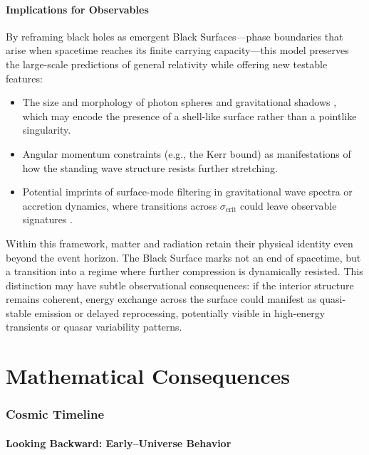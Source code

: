 \documentclass[12pt]{article}
\begin{document}
\subsection{Implications for Observables}

By reframing black holes as emergent Black Surfaces—phase boundaries that arise when spacetime reaches its finite carrying capacity—this model preserves the large-scale predictions of general relativity while offering new testable features:
\begin{itemize}
    \item The size and morphology of photon spheres and gravitational shadows \cite{eventhorizon2019}, which may encode the presence of a shell-like surface rather than a pointlike singularity.
    \item Angular momentum constraints (e.g., the Kerr bound) as manifestations of how the standing wave structure resists further stretching.
    \item Potential imprints of surface-mode filtering in gravitational wave spectra or accretion dynamics, where transitions across $\sigma_{\text{crit}}$ could leave observable signatures \cite{abbott2016, cardoso2016}.
\end{itemize}

Within this framework, matter and radiation retain their physical identity even beyond the event horizon. The Black Surface marks not an end of spacetime, but a transition into a regime where further compression is dynamically resisted. This distinction may have subtle observational consequences: if the interior structure remains coherent, energy exchange across the surface could manifest as quasi-stable emission or delayed reprocessing, potentially visible in high-energy transients or quasar variability patterns.


\cleardoublepage
\part{Mathematical Consequences}

\section{Cosmic Timeline}

\subsection{Looking Backward: Early–Universe Behavior}
\end{document}
